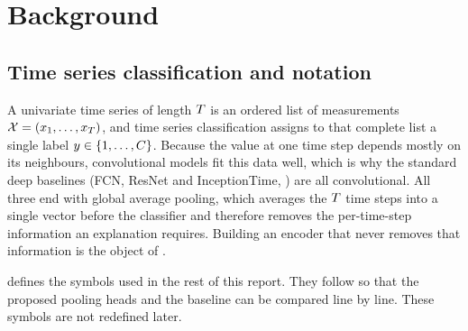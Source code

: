 %

\section{Background}
\label{sec:background}

\subsection{Time series classification and notation}
\label{sec:bg:tsc}

A univariate time series of length $T$ is an ordered list of measurements
$\mathcal{X} = (x_1, \dots, x_{T})$, and time series classification assigns to that complete
list a single label $y \in \{1, \dots, C\}$. Because the value at one time step depends mostly
on its neighbours, convolutional models fit this data well, which is why the standard deep baselines
(FCN, ResNet and InceptionTime, ) are all convolutional. All three end with
global average pooling, which averages the $T$ time steps into a single vector before the
classifier and therefore removes the per-time-step information an explanation requires. Building an
encoder that never removes that information is the object of .

 defines the symbols used in the rest of this report. They follow
\citet{early2024millet} so that the proposed pooling heads and the baseline can be compared line by
line. These symbols are not redefined later.

